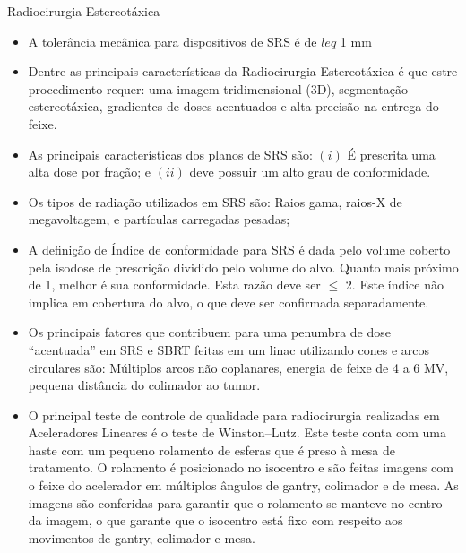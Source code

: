 \documentclass[11pt,a4paper]{article}
\newcounter{exemplo}
\begin{document}
\begin{exemplo}

    \textcolor{CarnationPink}{Radiocirurgia Estereotáxica}
    \begin{itemize}
        \item A tolerância mecânica para dispositivos de SRS é de $leq$ 1 mm
        
        \item Dentre as principais características da Radiocirurgia Estereotáxica é que estre procedimento requer: uma imagem tridimensional (3D), segmentação estereotáxica, gradientes de doses acentuados e alta precisão na entrega do feixe.
        
        \item As principais características dos planos de SRS são: $(i)$ É prescrita uma alta dose por fração; e $(ii)$ deve possuir um alto grau de conformidade.
        
        \item Os tipos de radiação utilizados em SRS são: Raios gama, raios-X de megavoltagem, e partículas carregadas pesadas;
        
        \item A definição de Índice de conformidade para SRS é dada pelo volume coberto pela isodose de prescrição dividido pelo volume do alvo. Quanto mais próximo de 1, melhor é sua conformidade. Esta razão deve ser $\leq$ 2. Este índice não implica em cobertura do alvo, o que deve ser confirmada separadamente. 
        
        \item Os principais fatores que contribuem para uma penumbra de dose ``acentuada'' em SRS e SBRT feitas em um linac utilizando cones e arcos circulares são: Múltiplos arcos não coplanares, energia de feixe de 4 a 6 MV, pequena distância do colimador ao tumor.
        
        \item O principal teste de controle de qualidade para radiocirurgia realizadas em Aceleradores Lineares é o teste de Winston–Lutz. Este teste conta com uma haste com um pequeno rolamento de esferas que é preso à mesa de tratamento. O rolamento é posicionado no isocentro e são feitas imagens com o feixe do acelerador em múltiplos ângulos de gantry, colimador e de mesa. As imagens são conferidas para garantir que o rolamento se manteve no centro da imagem, o que garante que o isocentro está fixo com respeito aos movimentos de gantry, colimador e mesa.
        

\end{itemize}
\end{exemplo}
\end{document}
